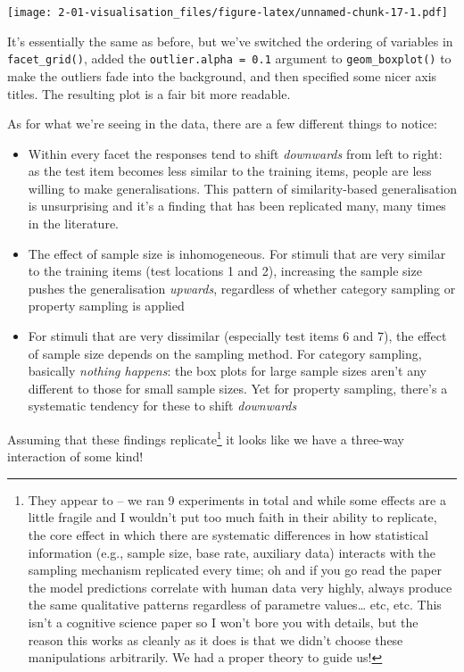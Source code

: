 \documentclass[]{book}
\providecommand{\tightlist}{%
  \setlength{\itemsep}{0pt}\setlength{\parskip}{0pt}}
\let\rmarkdownfootnote\footnote%
\def\footnote{\protect\rmarkdownfootnote}
\begin{document}
\texttt{[image: 2-01-visualisation\_files/figure-latex/unnamed-chunk-17-1.pdf]}

It's essentially the same as before, but we've switched the ordering of variables in \texttt{facet\_grid()}, added the \texttt{outlier.alpha\ =\ 0.1} argument to \texttt{geom\_boxplot()} to make the outliers fade into the background, and then specified some nicer axis titles. The resulting plot is a fair bit more readable.

As for what we're seeing in the data, there are a few different things to notice:

\begin{itemize}
\tightlist
\item
  Within every facet the responses tend to shift \emph{downwards} from left to right: as the test item becomes less similar to the training items, people are less willing to make generalisations. This pattern of similarity-based generalisation is unsurprising and it's a finding that has been replicated many, many times in the literature.
\item
  The effect of sample size is inhomogeneous. For stimuli that are very similar to the training items (test locations 1 and 2), increasing the sample size pushes the generalisation \emph{upwards}, regardless of whether category sampling or property sampling is applied
\item
  For stimuli that are very dissimilar (especially test items 6 and 7), the effect of sample size depends on the sampling method. For category sampling, basically \emph{nothing happens}: the box plots for large sample sizes aren't any different to those for small sample sizes. Yet for property sampling, there's a systematic tendency for these to shift \emph{downwards}
\end{itemize}

Assuming that these findings replicate\footnote{They appear to -- we ran 9 experiments in total and while some effects are a little fragile and I wouldn't put too much faith in their ability to replicate, the core effect in which there are systematic differences in how statistical information (e.g., sample size, base rate, auxiliary data) interacts with the sampling mechanism replicated every time; oh and if you go read the paper the model predictions correlate with human data very highly, always produce the same qualitative patterns regardless of parametre values\ldots{} etc, etc. This isn't a cognitive science paper so I won't bore you with details, but the reason this works as cleanly as it does is that we didn't choose these manipulations arbitrarily. We had a proper theory to guide us!} it looks like we have a three-way interaction of some kind!
\end{document}
